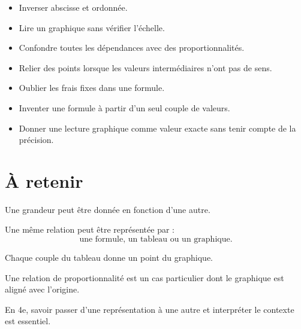 \begin{itemize}
\item Inverser abscisse et ordonnée.
\item Lire un graphique sans vérifier l'échelle.
\item Confondre toutes les dépendances avec des proportionnalités.
\item Relier des points lorsque les valeurs intermédiaires n'ont pas de sens.
\item Oublier les frais fixes dans une formule.
\item Inventer une formule à partir d'un seul couple de valeurs.
\item Donner une lecture graphique comme valeur exacte sans tenir compte de la précision.
\end{itemize}

\section{À retenir}

\begin{aretenir}
Une grandeur peut être donnée en fonction d'une autre.

Une même relation peut être représentée par :
\[
\boxed{\text{une formule, un tableau ou un graphique}}.
\]

Chaque couple du tableau donne un point du graphique.

Une relation de proportionnalité est un cas particulier dont le graphique est aligné avec l'origine.

En 4e, savoir passer d'une représentation à une autre et interpréter le contexte est essentiel.
\end{aretenir}
